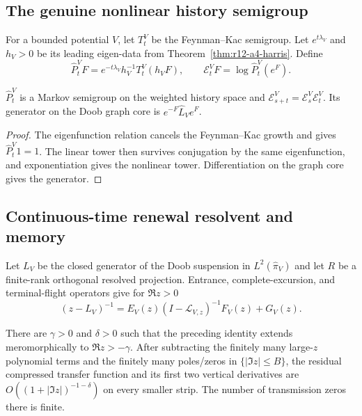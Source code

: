 \subsection{The genuine nonlinear history semigroup}

For a bounded potential $V$, let $T_t^V$ be the Feynman--Kac semigroup.  Let
$e^{t\lambda_V}$ and $h_V>0$ be its leading eigen-data from
Theorem~\ref{thm:r12-a4-harris}.  Define
\[
 \widehat P_t^VF
 =e^{-t\lambda_V}h_V^{-1}T_t^V(h_VF),
 \qquad
 \mathcal E_t^VF=\log\widehat P_t^V(e^F).
\]

\begin{proposition}
\label{prop:r12-a4-doob}
$\widehat P_t^V$ is a Markov semigroup on the weighted history space and
$\mathcal E_{s+t}^V=\mathcal E_s^V\mathcal E_t^V$.  Its generator on the
Doob graph core is
$e^{-F}\widehat L_Ve^F$.
\end{proposition}

\begin{proof}
The eigenfunction relation cancels the Feynman--Kac growth and gives
$\widehat P_t^V1=1$.  The linear tower then survives conjugation by the same
eigenfunction, and exponentiation gives the nonlinear tower.  Differentiation
on the graph core gives the generator.
\end{proof}

\subsection{Continuous-time renewal resolvent and memory}

Let $L_V$ be the closed generator of the Doob suspension in
$L^2(\widehat\pi_V)$ and let $R$ be a finite-rank orthogonal resolved
projection.  Entrance, complete-excursion, and terminal-flight operators give
for $\Re z>0$
\[
 (z-L_V)^{-1}=E_V(z)(I-\mathcal L_{V,z})^{-1}F_V(z)+G_V(z).
\]

\begin{theorem}
\label{thm:r12-a4-resolvent}
There are $\gamma>0$ and $\delta>0$ such that the preceding identity extends
meromorphically to $\Re z> -\gamma$.  After subtracting the finitely many
large-$z$ polynomial terms and the finitely many poles/zeros in
$\{|\Im z|\le B\}$, the residual compressed transfer function and its first
two vertical derivatives are $O((1+|\Im z|)^{-1-\delta})$ on every smaller
strip.  The number of transmission zeros there is finite.
\end{theorem}

